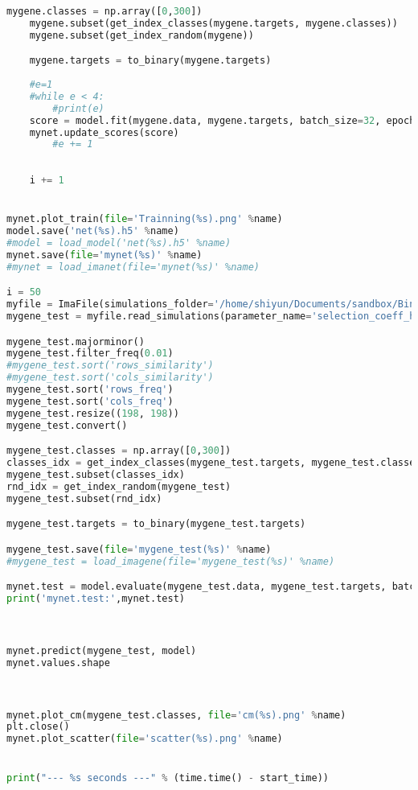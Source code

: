 \begin{lstlisting}[language=Python,breaklines]
    mygene.classes = np.array([0,300])
    mygene.subset(get_index_classes(mygene.targets, mygene.classes))
    mygene.subset(get_index_random(mygene))

    mygene.targets = to_binary(mygene.targets)
    
    #e=1
    #while e < 4:
        #print(e)
    score = model.fit(mygene.data, mygene.targets, batch_size=32, epochs=1, verbose=1, validation_split=0.10)
    mynet.update_scores(score)
        #e += 1
    
    
    i += 1


mynet.plot_train(file='Trainning(%s).png' %name)
model.save('net(%s).h5' %name)
#model = load_model('net(%s).h5' %name)
mynet.save(file='mynet(%s)' %name)
#mynet = load_imanet(file='mynet(%s)' %name)

i = 50
myfile = ImaFile(simulations_folder='/home/shiyun/Documents/sandbox/Binary3/Simulations' + str(i) + '.Epoch3', nr_samples=198, model_name='3epoch-CEU')
mygene_test = myfile.read_simulations(parameter_name='selection_coeff_hetero', max_nrepl=2000)

mygene_test.majorminor()
mygene_test.filter_freq(0.01)
#mygene_test.sort('rows_similarity')
#mygene_test.sort('cols_similarity')
mygene_test.sort('rows_freq')
mygene_test.sort('cols_freq')
mygene_test.resize((198, 198))
mygene_test.convert()

mygene_test.classes = np.array([0,300])
classes_idx = get_index_classes(mygene_test.targets, mygene_test.classes)
mygene_test.subset(classes_idx)
rnd_idx = get_index_random(mygene_test)
mygene_test.subset(rnd_idx)

mygene_test.targets = to_binary(mygene_test.targets)

mygene_test.save(file='mygene_test(%s)' %name)
#mygene_test = load_imagene(file='mygene_test(%s)' %name)

mynet.test = model.evaluate(mygene_test.data, mygene_test.targets, batch_size=None, verbose=0)
print('mynet.test:',mynet.test)



mynet.predict(mygene_test, model)
mynet.values.shape



mynet.plot_cm(mygene_test.classes, file='cm(%s).png' %name)
plt.close()
mynet.plot_scatter(file='scatter(%s).png' %name)


print("--- %s seconds ---" % (time.time() - start_time))

\end{lstlisting}





